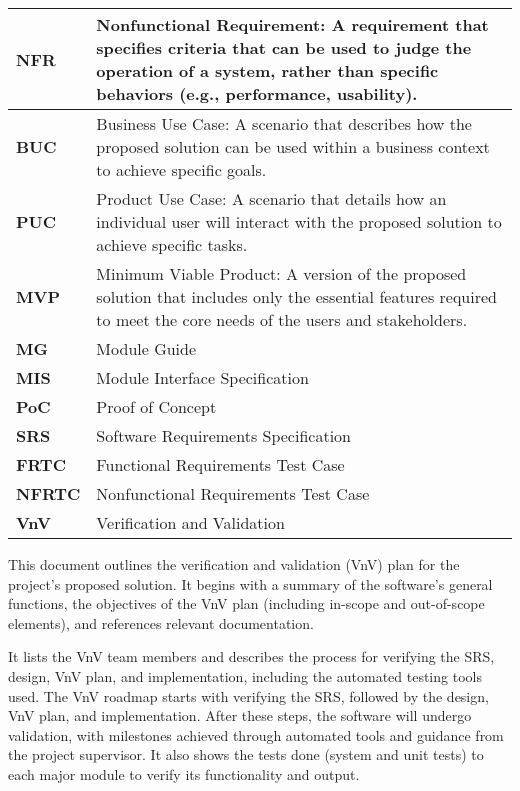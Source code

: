 \documentclass[12pt, titlepage]{article}
\begin{document}
\begin{longtable}[c]{|p{}|p{}|}
  \textbf{NFR} & Nonfunctional Requirement: A requirement that specifies criteria that can be used to judge the operation of a system, rather than specific behaviors (e.g., performance, usability). \\ \hline
  \textbf{BUC} & Business Use Case: A scenario that describes how the proposed solution can be used within a business context to achieve specific goals. \\ \hline
  \textbf{PUC} & Product Use Case: A scenario that details how an individual user will interact with the proposed solution to achieve specific tasks. \\ \hline
  \textbf{MVP} & Minimum Viable Product: A version of the proposed solution that includes only the essential features required to meet the core needs of the users and stakeholders. \\ \hline
  \textbf{MG} & Module Guide \\ \hline
  \textbf{MIS} & Module Interface Specification \\ \hline
  \textbf{PoC} & Proof of Concept \\ \hline
  \textbf{SRS} & Software Requirements Specification \\ \hline
  \textbf{FRTC} & Functional Requirements Test Case \\ \hline
  \textbf{NFRTC} & Nonfunctional Requirements Test Case \\ \hline
  \textbf{VnV} & Verification and Validation \\ \hline
\end{longtable}

\pagebreak
\newpage


This document outlines the verification and validation (VnV) plan for the project's proposed solution. It begins with a summary of the software's general functions, the objectives of the VnV plan (including in-scope and out-of-scope elements), and references relevant documentation.

It lists the VnV team members and describes the process for verifying the SRS, design, VnV plan, and implementation, including the automated testing tools used. The VnV roadmap starts with verifying the SRS, followed by the design, VnV plan, and implementation. After these steps, the software will undergo validation, with milestones achieved through automated tools and guidance from the project supervisor. It also shows the tests done (system and unit tests) to each major module to verify its functionality and output.
\end{document}
